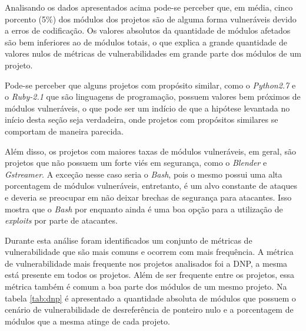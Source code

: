 Analisando os dados apresentados acima pode-se perceber que, em média, cinco porcento (5\%) dos módulos
dos projetos são de alguma forma vulneráveis devido a erros de codificação. Os valores absolutos da
quantidade de módulos afetados são bem inferiores ao de módulos totais, o que explica a grande quantidade
de valores nulos de métricas de vulnerabilidades em grande parte dos módulos de um projeto.

Pode-se perceber que alguns projetos com propósito similar, como o \emph{Python2.7} e o \emph{Ruby-2.1}
que são linguagens de programação, possuem valores bem próximos de módulos vulneráveis, o que pode ser um
indício de que a hipótese levantada no início desta seção seja verdadeira, onde projetos com propósitos
similares se comportam de maneira parecida.

Além disso, os projetos com maiores taxas de módulos vulneráveis, em geral, são projetos que não possuem
um forte viés em segurança, como o \emph{Blender} e \emph{Gstreamer}. A exceção nesse caso seria o \emph{Bash},
pois o mesmo possui uma alta porcentagem de módulos vulneráveis, entretanto, é um alvo constante de ataques e
deveria se preocupar em não deixar brechas de segurança para atacantes. Isso mostra que o \emph{Bash} por 
enquanto ainda é uma boa opção para a utilização de \textit{exploits} por parte de atacantes.

Durante esta análise foram identificados um conjunto de métricas de vulnerabilidade que são mais comuns e
ocorrem com mais frequência. A métrica de vulnerabilidade mais frequente nos projetos analisados foi a DNP,
a mesma está presente em todos os projetos. Além de ser frequente entre os projetos, essa métrica também
é comum a boa parte dos módulos de um mesmo projeto. Na tabela \ref{tab:dnp} é apresentado a quantidade
absoluta de módulos que possuem o cenário de vulnerabilidade de desreferência de ponteiro nulo e a porcentagem
de módulos que a mesma atinge de cada projeto.


